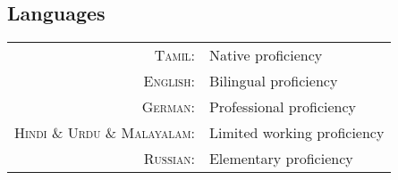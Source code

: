 \subsection{Languages}
\begin{tabular}
	{rl} \textsc{Tamil:}&Native proficiency\\
	\textsc{English:}&Bilingual proficiency\\
	\textsc{German:}&Professional proficiency\\
	\textsc{Hindi \& Urdu \& Malayalam:}&Limited working proficiency\\
	\textsc{Russian:}&Elementary proficiency\\
\end{tabular}
